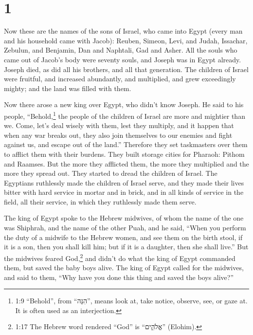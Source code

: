 \hypertarget{section}{%
\section{1}\label{section}}

 Now these are the names of the sons of Israel, who came
into Egypt (every man and his household came with Jacob): 
Reuben, Simeon, Levi, and Judah,  Issachar, Zebulun, and
Benjamin,  Dan and Naphtali, Gad and Asher.  All
the souls who came out of Jacob's body were seventy souls, and Joseph
was in Egypt already.  Joseph died, as did all his brothers,
and all that generation.  The children of Israel were
fruitful, and increased abundantly, and multiplied, and grew exceedingly
mighty; and the land was filled with them.

 Now there arose a new king over Egypt, who didn't know
Joseph.  He said to his people, ``Behold,\footnote{1:9
  ``Behold'', from ``הִנֵּה'', means look at, take notice, observe, see,
  or gaze at. It is often used as an interjection.} the people of the
children of Israel are more and mightier than we.  Come,
let's deal wisely with them, lest they multiply, and it happen that when
any war breaks out, they also join themselves to our enemies and fight
against us, and escape out of the land.''  Therefore they
set taskmasters over them to afflict them with their burdens. They built
storage cities for Pharaoh: Pithom and Raamses.  But the
more they afflicted them, the more they multiplied and the more they
spread out. They started to dread the children of Israel. 
The Egyptians ruthlessly made the children of Israel serve,
 and they made their lives bitter with hard service in
mortar and in brick, and in all kinds of service in the field, all their
service, in which they ruthlessly made them serve.

 The king of Egypt spoke to the Hebrew midwives, of whom
the name of the one was Shiphrah, and the name of the other Puah,
 and he said, ``When you perform the duty of a midwife to
the Hebrew women, and see them on the birth stool, if it is a son, then
you shall kill him; but if it is a daughter, then she shall live.''
 But the midwives feared God,\footnote{1:17 The Hebrew word
  rendered ``God'' is ``אֱלֹהִ֑ים'' (Elohim).} and didn't do what the
king of Egypt commanded them, but saved the baby boys alive.
 The king of Egypt called for the midwives, and said to
them, ``Why have you done this thing and saved the boys alive?''

